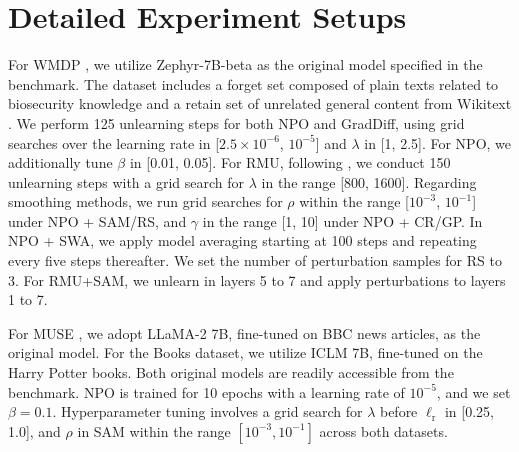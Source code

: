 \section{Detailed Experiment Setups}
\label{appendix: exp_setup}

For WMDP \citep{li2024wmdp}, we utilize Zephyr-7B-beta as the original model specified in the benchmark. The dataset includes a forget set composed of plain texts related to biosecurity knowledge and a retain set of unrelated general content from Wikitext \citep{merity2016pointer}. We perform 125 unlearning steps for both NPO and GradDiff, using grid searches over the learning rate in [$2.5 \times 10^{-6}$, $10^{-5}$] and $\lambda$ in [1, 2.5]. For NPO, we additionally tune $\beta$ in [0.01, 0.05]. For RMU, following \citep{li2024wmdp}, we conduct 150 unlearning steps with a grid search for $\lambda$ in the range [800, 1600]. Regarding smoothing methods, we run grid searches for $\rho$ within the range [$10^{-3}$, $10^{-1}$] under NPO + SAM/RS, and $\gamma$ in the range [1, 10] under NPO + CR/GP. In NPO + SWA, we apply model averaging starting at 100 steps and repeating every five steps thereafter. We set the number of perturbation samples for RS to 3. For RMU+SAM, we unlearn in layers 5 to 7 and apply perturbations to layers 1 to 7.


For MUSE \citep{shi2024muse}, we adopt LLaMA-2 7B, fine-tuned on BBC news articles, as the original model. For the Books dataset, we utilize ICLM 7B, fine-tuned on the Harry Potter books. Both original models are readily accessible from the benchmark. NPO is trained for 10 epochs with a learning rate of $10^{-5}$, and we set $\beta = 0.1$. Hyperparameter tuning involves a grid search for $\lambda$ before $\ell_\mathrm{r}$ in [0.25, 1.0], and $\rho$ in SAM within the range $[10^{-3}, 10^{-1}]$ across both datasets.